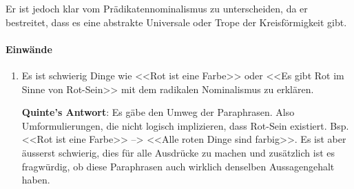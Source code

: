 \documentclass[../main.tex]{subfiles}
\begin{document}
Er ist jedoch klar vom Prädikatennominalismus zu unterscheiden, da er bestreitet, dass es eine abstrakte Universale oder Trope der Kreisförmigkeit gibt. 
\paragraph{Einwände}
\begin{enumerate}
	\item Es ist schwierig Dinge wie <<Rot ist eine Farbe>> oder <<Es gibt Rot im Sinne von Rot-Sein>> mit dem radikalen Nominalismus zu erklären. 
		
		\textbf{Quinte's Antwort}: Es gäbe den Umweg der Paraphrasen. Also Umformulierungen, die nicht logisch implizieren, dass Rot-Sein existiert. Bsp. <<Rot ist eine Farbe>> --> <<Alle roten Dinge sind farbig>>. Es ist aber äusserst schwierig, dies für alle Ausdrücke zu machen und zusätzlich ist es fragwürdig, ob diese Paraphrasen auch wirklich denselben Aussagengehalt haben. 
\end{enumerate}
\end{document}
